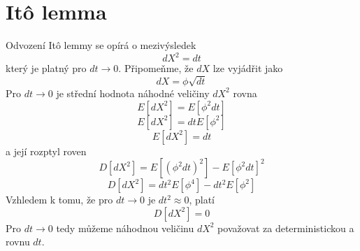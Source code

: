 \documentclass[a4paper]{book}
\begin{document}
\section{It\^o lemma}

Odvození It\^o lemmy se opírá o mezivýsledek
\begin{equation}
 dX^2 = dt
\end{equation}
který je platný pro $dt \rightarrow 0$. Připomeňme, že $dX$ lze vyjádřit jako
\begin{equation*}
dX = \phi \sqrt{dt}
\end{equation*} 
Pro $dt \rightarrow 0$ je střední hodnota náhodné veličiny $dX^2$ rovna
\begin{equation*}
E[dX^2] = E[\phi^2 dt]
\end{equation*}
\begin{equation*}
E[dX^2] = dt E[\phi^2]
\end{equation*}
\begin{equation*}
E[dX^2] = dt
\end{equation*}
a její rozptyl roven
\begin{equation*}
D[dX^2] = E[(\phi^2 dt)^2] - E[\phi^2 dt]^2
\end{equation*}
\begin{equation*}
D[dX^2] = dt^2E[\phi^4] - dt^2E[\phi^2]
\end{equation*}
Vzhledem k tomu, že pro $dt \rightarrow 0$ je $dt^2 \approx 0$, platí 
\begin{equation*}
D[dX^2] = 0
\end{equation*}
Pro $dt \rightarrow 0$ tedy můžeme náhodnou veličinu $dX^2$ považovat za deterministickou a rovnu $dt$.
\end{document}
